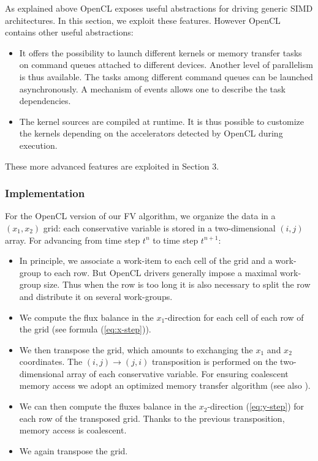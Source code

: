 \documentclass[preprint]{sig-alternate}
\begin{document}
As explained above OpenCL exposes useful abstractions for driving generic SIMD architectures. In this section, we exploit these features. However OpenCL  contains other useful abstractions:
\begin{itemize}
\item It offers the possibility to launch different kernels or memory transfer tasks on command queues attached to different devices. Another level of parallelism is thus available. The tasks  among different command queues can be launched asynchronously. A mechanism of events allows one to describe the task dependencies.
\item The kernel sources are compiled at runtime. It is thus possible to customize the kernels  depending on the accelerators detected by OpenCL during execution.
\end{itemize}
These more advanced features are exploited in Section 3.%

\subsubsection{Implementation}
For the OpenCL version of our FV algorithm, we organize the data in a $(x_{1},x_{2})$ grid: each conservative variable is stored in a two-dimensional $(i,j)$ array. For advancing from time step $t^n$ to time step $t^{n+1}$:
\begin{itemize}
\item In principle, we associate a work-item to each cell of the grid and a work-group
to each row. But OpenCL drivers generally impose a maximal work-group size. Thus when the row is too long it is also necessary to split the row and distribute it on several work-groups.
\item We compute the flux balance in the $x_{1}$-direction for each cell
of each row of the grid (see formula (\ref{eq:x-step})).
\item We then transpose the grid, which amounts to exchanging the $x_{1}$ and $x_{2}$ coordinates. The $(i,j)\to (j,i)$ transposition is performed on the two-dimensional array of each conservative variable. For ensuring coalescent memory access we adopt an optimized
memory transfer algorithm \cite{ruetsch2009optimizing} (see also
\cite{michea2010accelerating}).
\item We can then compute the fluxes balance in the $x_{2}$-direction (\ref{eq:y-step}) for each row
of the transposed grid. Thanks to the previous transposition, memory access is coalescent.
\item We again transpose the grid.
\end{itemize}
\end{document}
